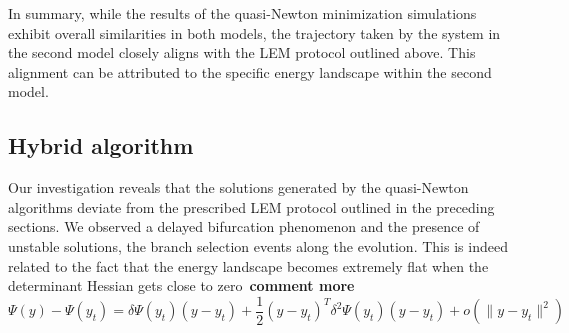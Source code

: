 In summary, while the results of the quasi-Newton minimization simulations exhibit overall similarities in both models, the trajectory taken by the system in the second model closely aligns with the LEM protocol outlined above. This alignment can be attributed to the specific energy landscape within the second model.


\subsection{Hybrid algorithm}
Our investigation reveals that the solutions generated by the quasi-Newton algorithms deviate from the prescribed LEM protocol outlined in the preceding sections. We observed a delayed bifurcation phenomenon and the presence of unstable solutions,  the branch selection events along the evolution.  This is indeed related to the fact that the energy landscape becomes extremely flat when the determinant Hessian gets close to zero~\textbf{comment more}
$$
\Psi(y)-\Psi(y_t)= \delta\Psi(y_t)(y-y_t)+\frac{1}{2}(y-y_t)^T \delta^2\Psi(y_t)(y-y_t)+o(\|y-y_t\|^2)
$$


